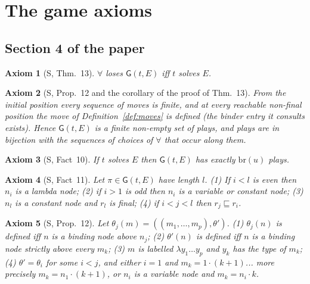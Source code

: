 \documentclass[11pt]{article}
\newcommand{\br}{\mathrm{br}}
\newcommand{\Gm}{\mathsf{G}}
\newcommand{\suc}[2]{#1{\cdot}#2}
\newcommand{\sq}{\sqsubseteq}
\theoremstyle{plain}
\newtheorem{axG}{Axiom}
\theoremstyle{definition}
\theoremstyle{remark}
\begin{document}
\section{The game axioms}\label{sec:axioms}

\subsection{Section 4 of the paper}

\begin{axG}[S, Thm.~13]\label{G:char}
$\forall$ loses $\Gm(t,E)$ iff $t$ solves $E$.
\end{axG}

\begin{axG}[S, Prop.~12 and the corollary of the proof of Thm.~13]\label{G:total}
From the initial position every sequence of moves is finite, and at
every reachable non-final position the move of
Definition~\ref{def:moves} is defined (the binder entry it consults
exists).  Hence $\Gm(t,E)$ is a finite non-empty set of plays, and plays
are in bijection with the sequences of choices of $\forall$ that occur
along them.
\end{axG}

\begin{axG}[S, Fact~10]\label{G:branches}
If $t$ solves $E$ then $\Gm(t,E)$ has exactly $\br(u)$ plays.
\end{axG}

\begin{axG}[S, Fact~11]\label{G:parity}
Let $\pi\in\Gm(t,E)$ have length $l$.  (1) If $i<l$ is even then $n_i$
is a lambda node; (2) if $i>1$ is odd then $n_i$ is a variable or
constant node; (3) $n_l$ is a constant node and $r_l$ is final; (4) if
$i<j<l$ then $r_j\sq r_i$.
\end{axG}

\begin{axG}[S, Prop.~12]\label{G:tables}
Let $\theta_j(m)=((m_1,\dots,m_p),\theta')$.  (1) $\theta_j(n)$ is defined
iff $n$ is a binding node above $n_j$; (2) $\theta'(n)$ is defined iff
$n$ is a binding node strictly above every $m_k$; (3) $m$ is labelled
$\lambda y_1\dots y_p$ and $y_k$ has the type of $m_k$; (4) $\theta'=
\theta_i$ for some $i<j$, and either $i=1$ and $m_k=\suc 1{(k+1)}$... more
precisely $m_k=\suc{n_1}{(k+1)}$, or $n_i$ is a variable node and
$m_k=\suc{n_i}k$.
\end{axG}
\end{document}
